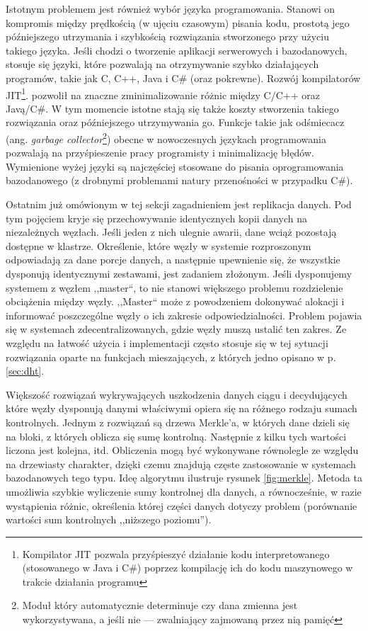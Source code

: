 \documentclass[a4paper,polish,12pt,twoside]{article}
\begin{document}
Istotnym problemem jest również wybór języka programowania. Stanowi on kompromis między prędkością (w ujęciu czasowym) pisania kodu, prostotą jego późniejszego utrzymania i szybkością rozwiązania stworzonego przy użyciu takiego języka. Jeśli chodzi o tworzenie aplikacji serwerowych i bazodanowych, stosuje się języki, które pozwalają na otrzymywanie szybko działających programów, takie jak C, C++, Java i C\# (oraz pokrewne). Rozwój kompilatorów JIT\footnote{Kompilator JIT pozwala przyśpieszyć działanie kodu interpretowanego (stosowanego w Java i C\#) poprzez kompilację ich do kodu maszynowego w trakcie działania programu}. pozwolił na znaczne zminimalizowanie różnic między C/C++ oraz Javą/C\#. W tym momencie istotne stają się także koszty stworzenia takiego rozwiązania oraz późniejszego utrzymywania go. Funkcje takie jak odśmiecacz (ang. \textit{garbage collector}\footnote{Moduł który automatycznie determinuje czy dana zmienna jest wykorzystywana, a jeśli nie --- zwalniający zajmowaną przez nią pamięć}) obecne w nowoczesnych językach programowania pozwalają na przyśpieszenie pracy programisty i minimalizację błędów. Wymienione wyżej języki są najczęściej stosowane do pisania oprogramowania bazodanowego (z drobnymi problemami natury przenośności w przypadku C\#).

Ostatnim już omówionym w tej sekcji zagadnieniem jest replikacja danych. Pod tym pojęciem kryje się przechowywanie identycznych kopii danych na niezależnych węzłach. Jeśli jeden z nich ulegnie awarii, dane wciąż pozostają dostępne w klastrze. Określenie, które węzły w systemie rozproszonym odpowiadają za dane porcje danych, a następnie upewnienie się, że wszystkie dysponują identycznymi zestawami, jest zadaniem złożonym. Jeśli dysponujemy systemem z węzłem ,,master``, to nie stanowi większego problemu rozdzielenie obciążenia między węzły. ,,Master`` może z powodzeniem dokonywać alokacji i informować poszczególne węzły o ich zakresie odpowiedzialności. Problem pojawia się w systemach zdecentralizowanych, gdzie węzły muszą ustalić ten zakres. Ze względu na łatwość użycia i implementacji często stosuje się w tej sytuacji rozwiązania oparte na funkcjach mieszających,  z których jedno opisano w p. \ref{sec:dht}.
	
Większość rozwiązań wykrywających uszkodzenia danych ciągu i decydujących które węzły dysponują danymi właściwymi opiera się na różnego rodzaju sumach kontrolnych. Jednym z rozwiązań są drzewa Merkle'a, w których dane dzieli się na bloki, z których oblicza się sumę kontrolną. Następnie z kilku tych wartości liczona jest kolejna, itd. Obliczenia mogą być wykonywane równolegle ze względu na drzewiasty charakter, dzięki czemu znajdują częste zastosowanie w systemach bazodanowych tego typu. Ideę algorytmu ilustruje rysunek \ref{fig:merkle}. Metoda ta umożliwia szybkie wyliczenie sumy kontrolnej dla danych, a równocześnie, w razie wystąpienia różnic, określenia której części danych dotyczy problem (porównanie wartości sum kontrolnych ,,niższego poziomu''). 
\end{document}
